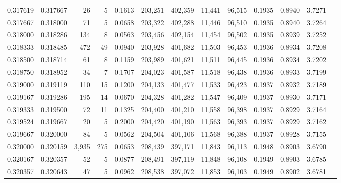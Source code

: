 \begin{tabular}{rrrrrrrrrrrrr}
0.317619 & 0.317667 &    26 &   5 &                                     0.1613 & 203,251 & 402,359 &  11,441 &  96,515 & 0.1935 & 0.8940 & 3.7271 \\
0.317667 & 0.318000 &    71 &   5 &                                     0.0658 & 203,322 & 402,288 &  11,446 &  96,510 & 0.1935 & 0.8940 & 3.7264 \\
0.318000 & 0.318286 &   134 &   8 &                                     0.0563 & 203,456 & 402,154 &  11,454 &  96,502 & 0.1935 & 0.8939 & 3.7252 \\
0.318333 & 0.318485 &   472 &  49 &                                     0.0940 & 203,928 & 401,682 &  11,503 &  96,453 & 0.1936 & 0.8934 & 3.7208 \\
0.318500 & 0.318714 &    61 &   8 &                                     0.1159 & 203,989 & 401,621 &  11,511 &  96,445 & 0.1936 & 0.8934 & 3.7202 \\
0.318750 & 0.318952 &    34 &   7 &                                     0.1707 & 204,023 & 401,587 &  11,518 &  96,438 & 0.1936 & 0.8933 & 3.7199 \\
0.319000 & 0.319119 &   110 &  15 &                                     0.1200 & 204,133 & 401,477 &  11,533 &  96,423 & 0.1937 & 0.8932 & 3.7189 \\
0.319167 & 0.319286 &   195 &  14 &                                     0.0670 & 204,328 & 401,282 &  11,547 &  96,409 & 0.1937 & 0.8930 & 3.7171 \\
0.319333 & 0.319500 &    72 &  11 &                                     0.1325 & 204,400 & 401,210 &  11,558 &  96,398 & 0.1937 & 0.8929 & 3.7164 \\
0.319524 & 0.319667 &    20 &   5 &                                     0.2000 & 204,420 & 401,190 &  11,563 &  96,393 & 0.1937 & 0.8929 & 3.7162 \\
0.319667 & 0.320000 &    84 &   5 &                                     0.0562 & 204,504 & 401,106 &  11,568 &  96,388 & 0.1937 & 0.8928 & 3.7155 \\
0.320000 & 0.320159 & 3,935 & 275 &                                     0.0653 & 208,439 & 397,171 &  11,843 &  96,113 & 0.1948 & 0.8903 & 3.6790 \\
0.320167 & 0.320357 &    52 &   5 &                                     0.0877 & 208,491 & 397,119 &  11,848 &  96,108 & 0.1949 & 0.8903 & 3.6785 \\
0.320357 & 0.320643 &    47 &   5 &                                     0.0962 & 208,538 & 397,072 &  11,853 &  96,103 & 0.1949 & 0.8902 & 3.6781 \\

\end{tabular}
